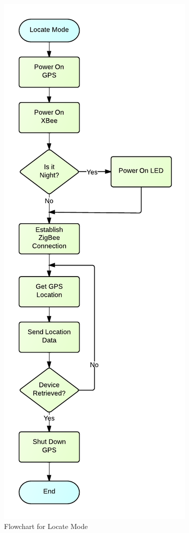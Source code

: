 \begin{figure}[H]
	\centering
	\includegraphics[scale=1.0]{img/LocateMode}
	\caption{Flowchart for Locate Mode \label{fig:locateMode}}
\end{figure}

